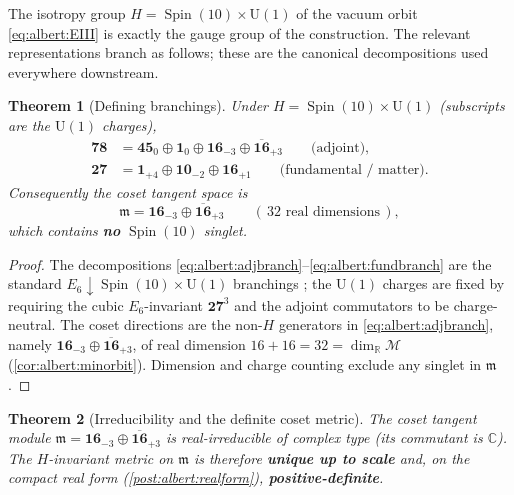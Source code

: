 \documentclass[11pt]{article}
\theoremstyle{plain}
\newtheorem{theorem}{Theorem}[section]
\theoremstyle{definition}
\theoremstyle{remark}
\begin{document}
The isotropy group $H=\operatorname{Spin}(10)\times\mathrm{U}(1)$ of the
vacuum orbit \eqref{eq:albert:EIII} is exactly the gauge group of the
construction. The relevant representations branch as follows; these are
the canonical decompositions used everywhere downstream.

\begin{theorem}[Defining branchings]\label{thm:albert:branchings}
Under $H=\operatorname{Spin}(10)\times\mathrm{U}(1)$ (subscripts are the
$\mathrm{U}(1)$ charges),
\begin{align}
  \mathbf{78}
   &= \mathbf{45}_{0}\oplus\mathbf{1}_{0}
      \oplus\mathbf{16}_{-3}\oplus\overline{\mathbf{16}}_{+3}
      \qquad\text{(adjoint),}
   \label{eq:albert:adjbranch}\\[2pt]
  \mathbf{27}
   &= \mathbf{1}_{+4}\oplus\mathbf{10}_{-2}\oplus\mathbf{16}_{+1}
      \qquad\text{(fundamental / matter).}
   \label{eq:albert:fundbranch}
\end{align}
Consequently the coset tangent space is
\begin{equation}\label{eq:albert:cosettangent}
  \mathfrak{m}
   = \mathbf{16}_{-3}\oplus\overline{\mathbf{16}}_{+3}
   \qquad(\,32\text{ real dimensions}\,),
\end{equation}
which contains \textbf{no} $\operatorname{Spin}(10)$ singlet.
\end{theorem}

\begin{proof}
The decompositions \eqref{eq:albert:adjbranch}--\eqref{eq:albert:fundbranch}
are the standard $E_{6}\downarrow\operatorname{Spin}(10)\times\mathrm{U}(1)$
branchings \cite{Slansky:1981}; the $\mathrm{U}(1)$ charges are fixed by
requiring the cubic $E_{6}$-invariant $\mathbf{27}^{3}$ and the adjoint
commutators to be charge-neutral. The coset directions are the
non-$H$ generators in \eqref{eq:albert:adjbranch}, namely
$\mathbf{16}_{-3}\oplus\overline{\mathbf{16}}_{+3}$, of real dimension
$16+16=32=\dim_{\mathbb{R}}\mathcal{M}$ (\autoref{cor:albert:minorbit}).
Dimension and charge counting exclude any singlet in $\mathfrak{m}$.
\end{proof}

\begin{theorem}[Irreducibility and the definite coset metric]\label{thm:albert:irrep}
The coset tangent module $\mathfrak{m}=\mathbf{16}_{-3}\oplus
\overline{\mathbf{16}}_{+3}$ is real-irreducible \emph{of complex type}
(its commutant is $\mathbb{C}$). The $H$-invariant metric on
$\mathfrak{m}$ is therefore \textbf{unique up to scale} and, on the
compact real form (\autoref{post:albert:realform}),
\textbf{positive-definite}.
\end{theorem}
\end{document}
